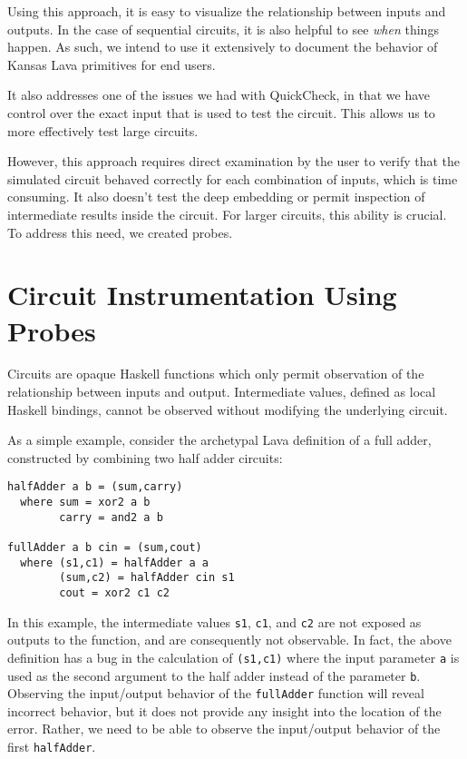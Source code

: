 \documentclass{llncs}
\begin{document}
Using this approach, it is easy to visualize the relationship
between inputs and outputs. In the case of sequential circuits, it is also
helpful to see \emph{when} things happen. As such, we intend to use it
extensively to document the behavior of Kansas Lava primitives for end users.

It also addresses one of the issues we had with QuickCheck, in that we have
control over the exact input that is used to test the circuit. This allows
us to more effectively test large circuits.

However, this approach requires direct examination by the user to verify that the
simulated circuit behaved correctly for each combination of inputs, which
is time consuming. It also doesn't test the deep embedding or permit
inspection of intermediate results inside the circuit. For larger circuits, this
ability is crucial. To address this need, we created probes.

\section{Circuit Instrumentation Using Probes}
\label{sec:probes}

Circuits are opaque Haskell functions which only permit
observation of the relationship between inputs and output. Intermediate
values, defined as local Haskell bindings, cannot be observed without modifying
the underlying circuit.

As a simple example, consider the archetypal Lava definition of a full adder,
constructed by combining two half adder circuits:

\begin{verbatim}
halfAdder a b = (sum,carry)
  where sum = xor2 a b
        carry = and2 a b

fullAdder a b cin = (sum,cout)
  where (s1,c1) = halfAdder a a
        (sum,c2) = halfAdder cin s1
        cout = xor2 c1 c2
\end{verbatim}

In this example, the intermediate values \verb!s1!, \verb!c1!, and \verb!c2! are
not exposed as outputs to the function, and are consequently not
observable. In fact, the above definition has a bug in the calculation of
\verb!(s1,c1)! where the input parameter \verb!a! is used as the second argument
to the half adder instead of the parameter \verb!b!. Observing the input/output
behavior of the \verb!fullAdder! function will reveal incorrect behavior, but it
does not provide any insight into the location of the error. Rather, we need to
be able to observe the input/output behavior of the first \verb!halfAdder!.
\end{document}
